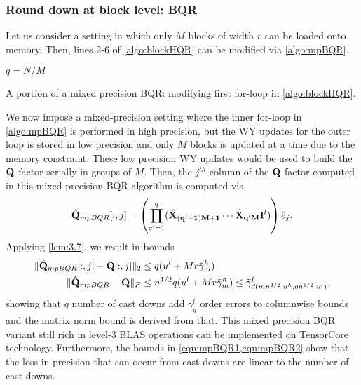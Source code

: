 \subsubsection{Round down at block level: BQR}\label{sec:mp-3b}
Let us consider a setting in which only $M$ blocks of width $r$ can be loaded onto memory.
Then, lines 2-6 of \cref{algo:blockHQR} can be modified via \cref{algo:mpBQR}.
\begin{algorithm2e}
	$q = N/M$
\caption{\label{algo:mpBQR} A portion of a mixed precision BQR: modifying first for-loop in \cref{algo:blockHQR}.}
\end{algorithm2e}
We now impose a mixed-precision setting where the inner for-loop in \cref{algo:mpBQR} is performed in high precision, but the WY updates for the outer loop is stored in low precision and only $M$ blocks is updated at a time due to the memory constraint.
These low precision WY updates would be used to build the $\mathbf{Q}$ factor serially in groups of $M$.
Then, the $j^{th}$ column of the $\mathbf{Q}$ factor computed in this mixed-precision BQR algorithm is computed via $$\hat{\mathbf{Q}}_{mpBQR}[:,j] = \left(\prod_{q'=1}^q(\hat{\mathbf{X}}_{\mathbf{(q'-1)M+1}}\cdots\hat{\mathbf{X}}_{\mathbf{q'M}}\mathbf{I}^l)\right) \hat{e}_j.$$
Applying \cref{lem:3.7}, we result in bounds
\begin{align}
	\|\hat{\bb{Q}}_{mpBQR}[:,j] - \bb{Q}[:,j]\|_2 &\leq q(u^l+Mr\tilde{\gamma}_m^h)\label{eqn:mpBQR1}\\%
	\|\hat{\bb{Q}}_{mpBQR} - \bb{Q}\|_F &\leq n^{1/2}q(u^l+Mr\tilde{\gamma}_m^h)\leq \tilde{\gamma}_{d(mn^{3/2}, u^h, qn^{1/2}, u^l)}^l,\label{eqn:mpBQR2}
\end{align}
showing that $q$ number of cast downs add $\gamma_q^l$ order errors to columnwise bounds and the matrix norm bound is derived from that.
This mixed precision BQR variant still rich in level-3 BLAS operations can be implemented on TensorCore technology.
Furthermore, the bounds in \cref{eqn:mpBQR1,eqn:mpBQR2} show that the loss in precision that can occur from cast downs are linear to the number of cast downs.
